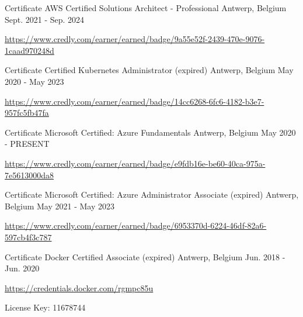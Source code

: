 \begin{cventries}
  \cventry
    {Certificate} %
    {AWS Certified Solutions Architect - Professional} %
    {Antwerp, Belgium} %
    {Sept. 2021 - Sep. 2024} %
    {
      \begin{cvitems} %
        \item \url{https://www.credly.com/earner/earned/badge/9a55e52f-2439-470e-9076-1caad970248d}
      \end{cvitems}
    }

  \cventry
    {Certificate} %
    {Certified Kubernetes Administrator (expired)} %
    {Antwerp, Belgium} %
    {May 2020 - May 2023} %
    {
      \begin{cvitems} %
        \item \url{https://www.credly.com/earner/earned/badge/14cc6268-6fc6-4182-b3e7-957fc5fb47fa}
      \end{cvitems}
    }

  \cventry
    {Certificate} %
    {Microsoft Certified: Azure Fundamentals} %
    {Antwerp, Belgium} %
    {May 2020 - PRESENT} %
    {
      \begin{cvitems} %
        \item \url{https://www.credly.com/earner/earned/badge/e9fdb16e-be60-40ca-975a-7e5613000da8}
      \end{cvitems}
    }

  \cventry
    {Certificate} %
    {Microsoft Certified: Azure Administrator Associate (expired)} %
    {Antwerp, Belgium} %
    {May 2021 - May 2023} %
    {
      \begin{cvitems} %
        \item \url{https://www.credly.com/earner/earned/badge/6953370d-6224-46df-82a6-597cb4f3c787}
      \end{cvitems}
    }

  \cventry
    {Certificate} %
    {Docker Certified Associate (expired)} %
    {Antwerp, Belgium} %
    {Jun. 2018 - Jun. 2020} %
    {
      \begin{cvitems} %
        \item \url{https://credentials.docker.com/rgmpc85u}
        \item {License Key: 11678744}
      \end{cvitems}
    }


\end{cventries}
